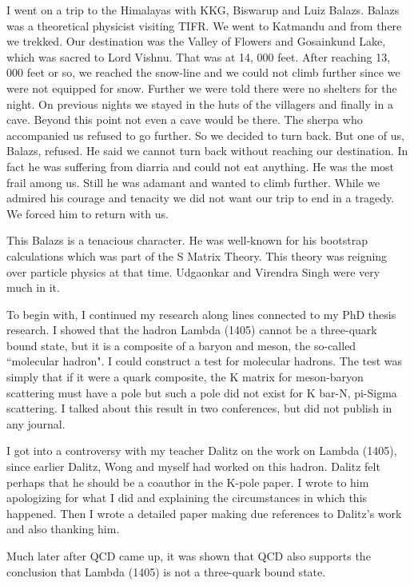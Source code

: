 I went on a trip to the Himalayas with KKG, Biswarup and Luiz Balazs. 
Balazs was a theoretical physicist visiting TIFR. We went to Katmandu 
and from there we trekked. Our destination was the Valley of Flowers and 
Gosainkund Lake, which was sacred to Lord Vishnu. That was at 14, 000 
feet. After reaching 13, 000 feet or so, we reached the snow-line and we 
could not climb further since we were not equipped for snow. Further we 
were told there were no shelters for the night. On previous nights we 
stayed in the huts of the villagers and finally in a cave. Beyond this 
point not even a cave would be there. The sherpa who accompanied us 
refused to go further. So we decided to turn back. But one of us, 
Balazs, refused. He said we cannot turn back without reaching our 
destination. In fact he was suffering from diarria and could not eat 
anything. He was the most frail among us. Still he was adamant and 
wanted to climb further. While we admired his courage and tenacity we 
did not want our trip to end in a tragedy. We forced him to return with 
us.
\eject

This Balazs is a tenacious character. He was well-known for his 
bootstrap calculations which was part of the S Matrix Theory. This 
theory was reigning over particle physics at that time. Udgaonkar and 
Virendra Singh were very much in it.

To begin with, I continued my research along lines connected to my PhD 
thesis research. I showed that the hadron Lambda (1405) cannot be a 
three-quark bound state, but it is a composite of a baryon and meson, 
the so-called ``molecular hadron". I could construct a test for molecular 
hadrons. The test was simply that if it were a quark composite, the K 
matrix for meson-baryon scattering must have a pole but such a pole did 
not exist for K bar-N, pi-Sigma scattering. I talked about this result 
in two conferences, but did not publish in any journal.

I got into a controversy with my teacher Dalitz on the work on Lambda 
(1405), since earlier Dalitz, Wong and myself had worked on this hadron. 
Dalitz felt perhaps that he should be a coauthor in the K-pole paper. I 
wrote to him apologizing for what I did and explaining the circumstances 
in which this happened. Then I wrote a detailed paper making due 
references to Dalitz's work and also thanking him.

Much later after QCD came up, it was shown that QCD also supports the 
conclusion that Lambda (1405) is not a three-quark bound state.

